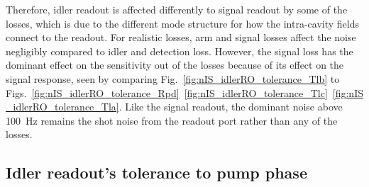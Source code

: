 Therefore, idler readout is affected differently to signal readout by some of the losses, which is due to the different mode structure for how the intra-cavity fields connect to the readout.
For realistic losses, arm and signal losses affect the noise negligibly compared to idler and detection loss. However, the signal loss has the dominant effect on the sensitivity out of the losses because of its effect on the signal response, seen by comparing Fig.~\ref{fig:nIS_idlerRO_tolerance_Tlb} to Figs.~\ref{fig:nIS_idlerRO_tolerance_Rpd}~\ref{fig:nIS_idlerRO_tolerance_Tlc}~\ref{fig:nIS_idlerRO_tolerance_Tla}.  Like the signal readout, the dominant noise above 100~Hz remains the shot noise from the readout port rather than any of the losses.



\subsection{Idler readout's tolerance to pump phase}

